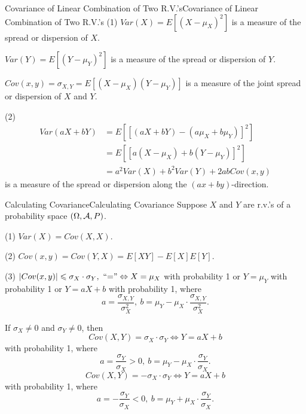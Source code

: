 \documentclass{elegantbook}
\begin{document}
\begin{remark}{Covariance of Linear Combination of Two R.V.'s}{Covariance of Linear Combination of Two R.V.'s}
(1)
\(Var(X) = E\left\lbrack \left( X - \mu_{X} \right)^{2} \right\rbrack\)
is a measure of the spread or dispersion of \(X\).

\( Var(Y) = E\left\lbrack \left( Y - \mu_{Y} \right)^{2} \right\rbrack\)
is a measure of the spread or dispersion of \(Y\).

\( Cov(x,y) = \sigma_{X,Y} = E\left\lbrack \left( X - \mu_{X} \right)\left( Y - \mu_{Y} \right) \right\rbrack\)
is a measure of the joint spread or dispersion of \(X\) and \(Y\).

(2)
\[\begin{aligned}
Var(aX + bY) &= E\left\lbrack \left[ \left( aX + bY \right) - \left( a\mu_{X} + b\mu_{Y} \right) \right]^{2} \right\rbrack\\
&= E\left\lbrack \left[ a\left( X - \mu_{X} \right) + b\left( Y - \mu_{Y} \right) \right]^{2} \right\rbrack\\
& = a^{2}Var(X) + b^{2}Var(Y) + 2abCov(x,y)
\end{aligned}\]
is a measure of the spread or dispersion along the \((ax + by)\)-direction.

\end{remark}

\begin{theorem}{Calculating Covariance}{Calculating Covariance}
Suppose \(X\) and \(Y\) are r.v.'s of a probability space $(\Omega,\mathcal{A}, P)$.

(1) \(Var(X) = Cov(X,X)\).

(2)
\(Cov(x,y) = Cov(Y,X) = E[XY] - E[X] E[Y].\)

(3)
\(\left| Cov(x,y) \right| \leqslant \sigma_{X}\cdot \sigma_{Y},\ \text{``=''} \Leftrightarrow X = \mu_{X}\) with probability 1 or
\(Y = \mu_{Y}\) with probability 1 or $Y=aX+b$ with probability 1, where
\[a = \frac{\sigma_{X,Y}}{\sigma_{X}^{2}},\ b = \mu_{Y} - \mu_{X} \cdot \frac{\sigma_{X,Y}}{\sigma_{X}^{2}}.\]

If \(\sigma_{X} \neq 0\) and \(\sigma_{Y} \neq 0\), then
\[Cov( X,Y)= \sigma_{X}\cdot \sigma_{Y} \Leftrightarrow Y = aX + b\]
with probability 1, where
\[a = \frac{\sigma_{Y}}{\sigma_{X}} > 0,\ b = \mu_{Y} - \mu_{X} \cdot \frac{\sigma_{Y}}{\sigma_{X}}.\]
\[Cov( X,Y)=- \sigma_{X}\cdot \sigma_{Y} \Leftrightarrow Y = aX + b\]
with probability 1, where
\[a = - \frac{\sigma_{Y}}{\sigma_{X}} < 0,\ b = \mu_{Y} + \mu_{X} \cdot \frac{\sigma_{Y}}{\sigma_{X}}.\]
\end{theorem}
\end{document}
